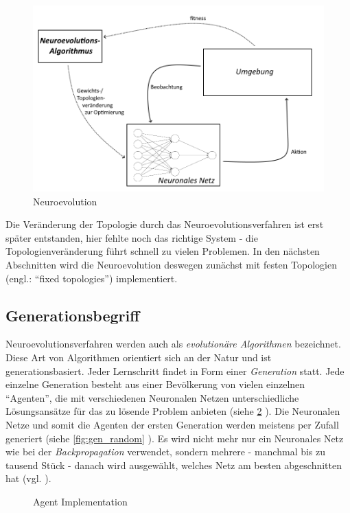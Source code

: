 \documentclass[parskip=half,titlepage]{scrartcl}
\begin{document}
\begin{figure}[h]
 \centering
 \includegraphics[scale=0.5]{Abbildungen/Neuroevolution.png}
 \caption{Neuroevolution}
 \label{fig:neuroevolution}
\end{figure}

Die Veränderung der Topologie durch das Neuroevolutionsverfahren ist erst später entstanden, hier fehlte noch das richtige System - die Topologienveränderung führt schnell zu vielen Problemen. In den nächsten Abschnitten wird die Neuroevolution deswegen zunächst mit festen Topologien (engl.: ``fixed topologies'') implementiert.

\subsection{Generationsbegriff}
Neuroevolutionsverfahren werden auch als \textit{evolutionäre Algorithmen} bezeichnet. Diese Art von Algorithmen orientiert sich an der Natur und ist generationsbasiert. Jeder Lernschritt findet in Form einer \textit{Generation} statt. Jede einzelne Generation besteht aus einer Bevölkerung von vielen einzelnen ``Agenten'', die mit verschiedenen Neuronalen Netzen unterschiedliche Lösungsansätze für das zu lösende Problem anbieten (siehe \cref{fig:agent} ). Die Neuronalen Netze und somit die Agenten der ersten Generation werden meistens per Zufall generiert (siehe \cref{fig:gen_random} ). Es wird nicht mehr nur ein Neuronales Netz wie bei der \textit{Backpropagation} verwendet, sondern mehrere - manchmal bis zu tausend Stück - danach wird ausgewählt, welches Netz am besten abgeschnitten hat (vgl. \cite[25-28]{eiben_smith_2016} ). \\

\begin{figure}[h]
 
 \caption{Agent Implementation}
 \label{fig:agent}
\end{figure}
\end{document}
